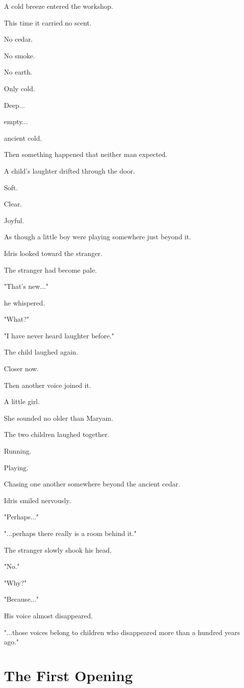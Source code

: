 \documentclass[12pt,openany]{book}
\begin{document}
A cold breeze entered the workshop.

This time it carried no scent.

No cedar.

No smoke.

No earth.

Only cold.

Deep...

empty...

ancient cold.

Then something happened that neither man expected.

A child's laughter drifted through the door.

Soft.

Clear.

Joyful.

As though a little boy were playing somewhere just beyond it.

Idris looked toward the stranger.

The stranger had become pale.

"That's new..."

he whispered.

"What?"

"I have never heard laughter before."

The child laughed again.

Closer now.

Then another voice joined it.

A little girl.

She sounded no older than Maryam.

The two children laughed together.

Running.

Playing.

Chasing one another somewhere beyond the ancient cedar.

Idris smiled nervously.

"Perhaps..."

"...perhaps there really is a room behind it."

The stranger slowly shook his head.

"No."

"Why?"

"Because..."

His voice almost disappeared.

"...those voices belong to children who disappeared more than a hundred years ago."
\section*{The First Opening}
\end{document}
